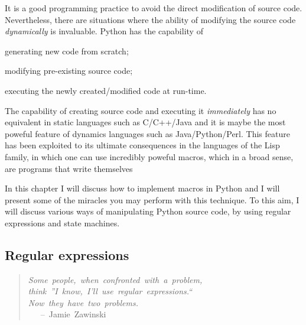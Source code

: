 \documentclass[10pt,english]{article}
\begin{document}
It is a good programming practice to avoid the direct modification
of source code. Nevertheless, there are situations where the ability of 
modifying the source code \emph{dynamically} is invaluable. Python has the
capability of
\begin{list}{)}
{
\setlength{\rightmargin}{\leftmargin}
}
\item {} 
generating new code from scratch;

\item {} 
modifying pre-existing source code;

\item {} 
executing the newly created/modified code at run-time.

\end{list}

The capability of creating source code and executing it \emph{immediately} has
no equivalent in static languages such as C/C++/Java and it is maybe the 
most poweful feature of dynamics languages such as Java/Python/Perl.
This feature has been exploited to its ultimate consequences in the languages
of the Lisp family, in which one can use incredibly poweful macros, which
in a broad sense, are programs that write themselves

In this chapter I will discuss how to implement macros in Python and I will
present some of the miracles you may perform with this technique. To this
aim, I will discuss various ways of manipulating Python source code, by
using regular expressions and state machines.



\hypertarget{regular-expressions}{}
\subsection*{Regular expressions}
\begin{quote}
\begin{flushleft}
\emph{Some~people,~when~confronted~with~a~problem,~~\\
think~''I~know,~I'll~use~regular~expressions.``~~\\
Now~they~have~two~problems.}~\\
~~~--~Jamie~Zawinski
\end{flushleft}
\end{quote}
\end{document}
